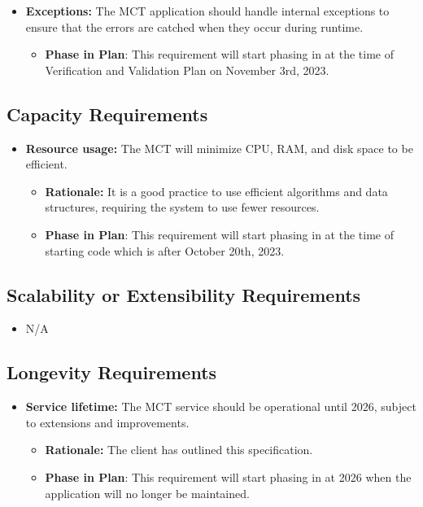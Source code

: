 \documentclass[12pt]{article}
\begin{document}
\begin{itemize}
    \item \textbf{Exceptions: }The MCT application should handle internal exceptions to ensure that the errors are catched when they occur during runtime.
    \begin{itemize}
        \item \textbf{Phase in Plan}: This requirement will start phasing in at the time of Verification and Validation Plan on November 3rd, 2023.
    \end{itemize}
\end{itemize}


\subsection{Capacity Requirements}

\begin{itemize}
    \item \textbf{Resource usage:} The MCT will minimize CPU, RAM, and disk space to be efficient.
    \begin{itemize}
        \item \textbf{Rationale: }It is a good practice to use efficient algorithms and data structures, requiring the system to use fewer resources.
        \item \textbf{Phase in Plan}: This requirement will start phasing in at the time of starting code which is after October 20th, 2023.
    \end{itemize}
\end{itemize}


\subsection{Scalability or Extensibility Requirements}
\begin{itemize}
    \item N/A
\end{itemize}
\subsection{Longevity Requirements}

\begin{itemize}
    \item \textbf{Service lifetime:} The MCT service should be operational until 2026, subject to extensions and improvements.
    \begin{itemize}
        \item \textbf{Rationale: }The client has outlined this specification.
        \item \textbf{Phase in Plan}: This requirement will start phasing in at 2026 when the application will no longer be maintained.
    \end{itemize}
\end{itemize}
\end{document}
